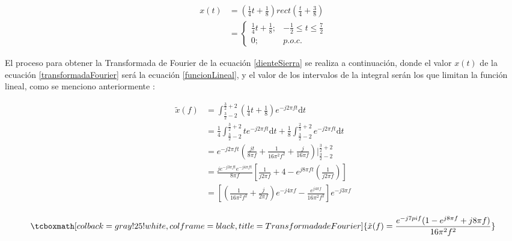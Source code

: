 \documentclass[11pt,letterpaper,twocolumn]{article}
\begin{document}
    \begin{equation}
        \begin{split}
            x(t)&=\left(\frac{1}{4} t + \frac{1}{8}\right)rect\left(\frac{t}{4} + \frac{3}{8}\right) \\
                &=  \left\lbrace  \begin{array}{ll}
                                    \frac{1}{4} t + \frac{1}{8}; & -\frac{1}{2} \leq t \leq \frac{7}{2} \\
                                    0; & p.o.c.
                                \end{array}
                    \right.      
        \end{split}
        \label{dienteSierra}
    \end{equation}

    El proceso para obtener la Transformada de Fourier de la ecuación \ref{dienteSierra} 
    se realiza a continuación, donde el valor $x(t)$ de la ecuación \ref{transformadaFourier} será la 
    ecuación \ref{funcionLineal}, y el valor de los intervalos de la integral serán los que 
    limitan la función lineal, como se menciono anteriormente \cite{silviaRB}: 

    \begin{equation*}
        \begin{split}
            \tilde{x}(f)& = \int_{\frac{3}{2} -2}^{\frac{3}{2} +2}\left(\frac{1}{4} t+\frac{1}{8} \right) e^{-j2\pi ft}\mathrm{d}t \\
                        & = \frac{1}{4} \int_{\frac{3}{2}-2}^{\frac{3}{2}+2}t e^{-j2\pi ft}\mathrm{d}t + \frac{1}{8} \int_{\frac{3}{2} -2}^{\frac{2}{3} +2} e^{-j2\pi ft}\mathrm{d}t \\
                        & = e^{-j2\pi ft}\left(\frac{jt}{8\pi f}  + \frac{1}{16\pi ^{2} f^2}  + \frac{j}{16\pi f} \right)  \Big|_{\frac{3}{2} -2}^{\frac{3}{2} +2} \\
                        & = \frac{je^{-j3\pi ft } e^{-j4\pi ft}}{8\pi f} \left[\frac{1}{j2\pi f} + 4 
                          - e^{j8\pi ft} \left(\frac{1}{j2\pi f} \right)\right] \\
                        & = \left[\left(\frac{1}{16\pi^2 f^2}+\frac{j}{2\pi f}\right)e^{-j4\pi f}-\frac{e^{j4\pi f}}{16\pi^2 f^2}\right] e^{-j3\pi f} \\
        \end{split}
    \end{equation*}  
  

    \begin{equation}
        \tcboxmath[colback=gray!25!white,colframe=black, title=Transformada de Fourier]{
            \tilde{x}(f) = \frac{e^{-j7pi f }(1 - e^{j8\pi f} + j8\pi f)}{16\pi^2 f^2}
        }
    \end{equation}

\printbibliography[title={Bibliografía}]
\end{document}
